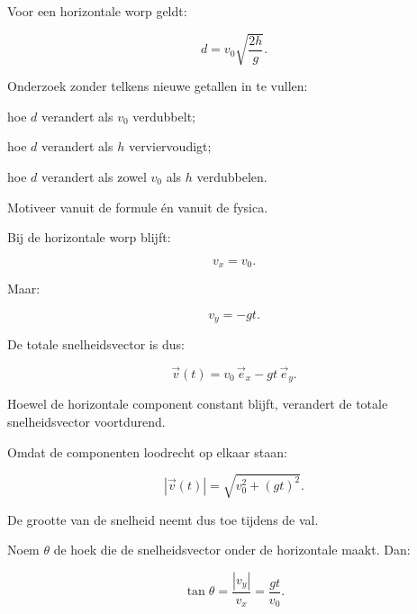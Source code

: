 \documentclass{ximera}
\begin{document}
\begin{oefening}[Schaalredenering]{\oefU\ESS}

Voor een horizontale worp geldt:

\[
d=v_0\sqrt{\frac{2h}{g}}.
\]

Onderzoek zonder telkens nieuwe getallen in te vullen:

\begin{question}
hoe $d$ verandert als $v_0$ verdubbelt;
\end{question}

\begin{question}
hoe $d$ verandert als $h$ verviervoudigt;
\end{question}

\begin{question}
hoe $d$ verandert als zowel $v_0$ als $h$ verdubbelen.
\end{question}

Motiveer vanuit de formule én vanuit de fysica.

\end{oefening}




Bij de horizontale worp blijft:

\[
v_x=v_0.
\]

Maar:

\[
v_y=-gt.
\]

De totale snelheidsvector is dus:

\[
\boxed{
\vec v(t)
=
v_0\,\vec e_x-gt\,\vec e_y.
}
\]

Hoewel de horizontale component constant blijft, verandert de totale
snelheidsvector voortdurend.



Omdat de componenten loodrecht op elkaar staan:

\[
\boxed{
|\vec v(t)|
=
\sqrt{v_0^2+(gt)^2}.
}
\]

De grootte van de snelheid neemt dus toe tijdens de val.



Noem $\theta$ de hoek die de snelheidsvector onder de horizontale
maakt. Dan:

\[
\tan\theta
=
\frac{|v_y|}{v_x}
=
\frac{gt}{v_0}.
\]
\end{document}
